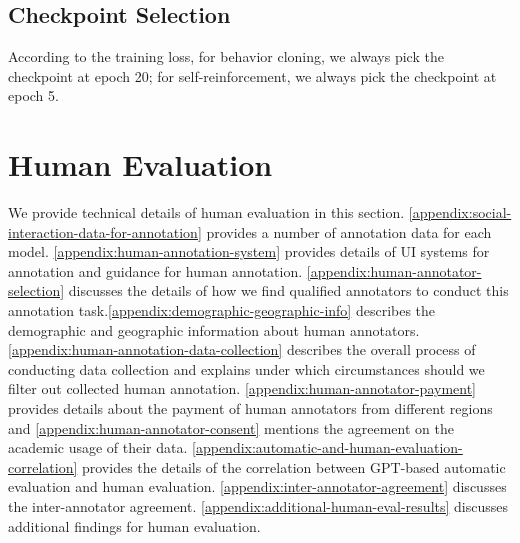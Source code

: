 \subsection{Checkpoint Selection}
\label{appendix:checkpoint-selection}
According to the training loss, for behavior cloning, we always pick the checkpoint at epoch 20; for self-reinforcement, we always pick the checkpoint at epoch 5. 



\section{Human Evaluation}
\label{appendix:details-of-human-evaluation}
We provide technical details of human evaluation in this section. \ref{appendix:social-interaction-data-for-annotation} provides a number of annotation data for each model. \ref{appendix:human-annotation-system} provides details of UI systems for annotation and guidance for human annotation. \ref{appendix:human-annotator-selection} discusses the details of how we find qualified annotators to conduct this annotation task.\ref{appendix:demographic-geographic-info} describes the demographic and geographic information about human annotators. \ref{appendix:human-annotation-data-collection} describes the overall process of conducting data collection and explains under which circumstances should we filter out collected human annotation. \ref{appendix:human-annotator-payment} provides details about the payment of human annotators from different regions and \ref{appendix:human-annotator-consent} mentions the agreement on the academic usage of their data. \ref{appendix:automatic-and-human-evaluation-correlation} provides the details of the correlation between GPT-based automatic evaluation and human evaluation. \ref{appendix:inter-annotator-agreement} discusses the inter-annotator agreement. \ref{appendix:additional-human-eval-results} discusses additional findings for human evaluation. 
 
